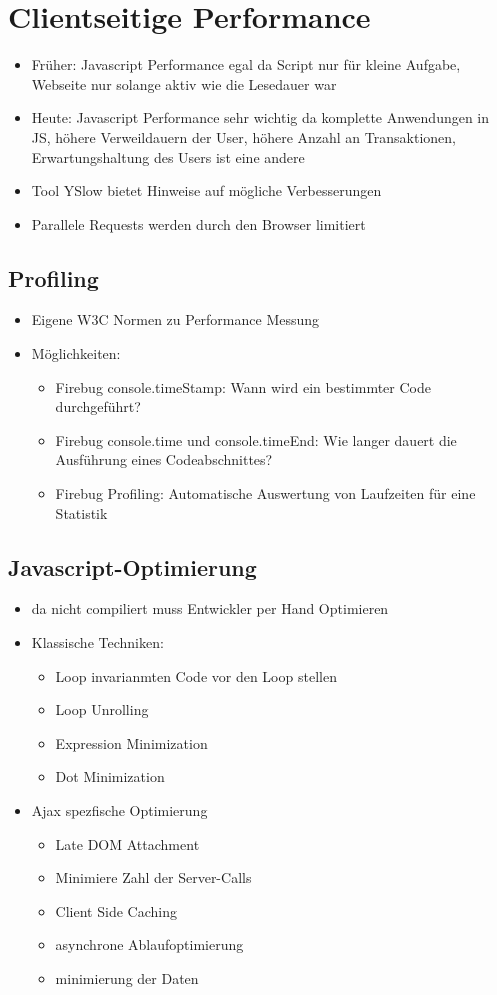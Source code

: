 \documentclass{article} %
\begin{document}
	
\section{Clientseitige Performance}
	\begin{itemize}
		\item Früher: Javascript Performance egal da Script nur für kleine Aufgabe, Webseite nur solange aktiv wie die Lesedauer war
		\item Heute: Javascript Performance sehr wichtig da komplette Anwendungen in JS, höhere Verweildauern der User, höhere Anzahl an Transaktionen, Erwartungshaltung des Users ist eine andere
		\item Tool YSlow bietet Hinweise auf mögliche Verbesserungen
		\item Parallele Requests werden durch den Browser limitiert
	\end{itemize}
	\subsection{Profiling}
	\begin{itemize}
		\item Eigene W3C Normen zu Performance Messung
		\item Möglichkeiten:
		\begin{itemize}
			\item Firebug console.timeStamp: Wann wird ein bestimmter Code durchgeführt?
			\item Firebug console.time und console.timeEnd: Wie langer dauert die Ausführung eines Codeabschnittes?
			\item Firebug Profiling: Automatische Auswertung von Laufzeiten für eine Statistik 
		\end{itemize}
	\end{itemize}
	\subsection{Javascript-Optimierung}
	\begin{itemize}
		\item da nicht compiliert muss Entwickler per Hand Optimieren
		\item Klassische Techniken:
		\begin{itemize}
			\item Loop invarianmten Code vor den Loop stellen
			\item Loop Unrolling
			\item Expression Minimization
			\item Dot Minimization
		\end{itemize}
		\item Ajax spezfische Optimierung
		\begin{itemize}
			\item Late DOM Attachment
			\item Minimiere Zahl der Server-Calls
			\item Client Side Caching
			\item asynchrone Ablaufoptimierung
			\item minimierung der Daten
		\end{itemize}
	\end{itemize}
\end{document}
